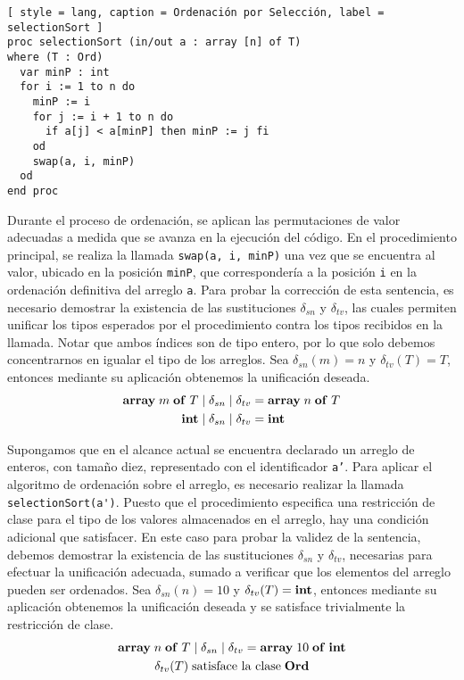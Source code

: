 \newpage

\begin{lstlisting}[ style = lang, caption = Ordenación por Selección, label = selectionSort ]
proc selectionSort (in/out a : array [n] of T)
where (T : Ord)
  var minP : int
  for i := 1 to n do
    minP := i
    for j := i + 1 to n do
      if a[j] < a[minP] then minP := j fi
    od
    swap(a, i, minP)
  od
end proc
\end{lstlisting}

Durante el proceso de ordenación, se aplican las permutaciones de valor adecuadas a medida que se avanza en la ejecución del código.
En el procedimiento principal, se realiza la llamada \lstinline[style = lang]{swap(a, i, minP)} una vez que se encuentra al valor, ubicado en la posición \texttt{minP}, que correspondería a la posición \texttt{i} en la ordenación definitiva del arreglo \texttt{a}.
Para probar la corrección de esta sentencia, es necesario demostrar la existencia de las sustituciones $\delta_{sn}$ y $\delta_{tv}$, las cuales permiten unificar los tipos esperados por el procedimiento contra los tipos recibidos en la llamada.
Notar que ambos índices son de tipo entero, por lo que solo debemos concentrarnos en igualar el tipo de los arreglos.
Sea $\delta_{sn}(m) = n$ y $\delta_{tv}(T) = T$, entonces mediante su aplicación obtenemos la unificación deseada.
\begin{align*}
\mathbf{array} \; m \; \mathbf{of} \; T \mid \delta_{sn} \mid \delta_{tv}
&=
\mathbf{array} \; n \; \mathbf{of} \; T
\\
\mathbf{int} \mid \delta_{sn} \mid \delta_{tv}
&=
\mathbf{int}
\end{align*}

Supongamos que en el alcance actual se encuentra declarado un arreglo de enteros, con tamaño diez, representado con el identificador \texttt{a'}.
Para aplicar el algoritmo de ordenación sobre el arreglo, es necesario realizar la llamada \lstinline[style = lang]{selectionSort(a')}.
Puesto que el procedimiento especifica una restricción de clase para el tipo de los valores almacenados en el arreglo, hay una condición adicional que satisfacer.
En este caso para probar la validez de la sentencia, debemos demostrar la existencia de las sustituciones $\delta_{sn}$ y $\delta_{tv}$, necesarias para efectuar la unificación adecuada, sumado a verificar que los elementos del arreglo pueden ser ordenados.
Sea $\delta_{sn}(n) = 10$ y $\delta_{tv}(T) = \mathbf{int}$, entonces mediante su aplicación obtenemos la unificación deseada y se satisface trivialmente
la restricción de clase.
\begin{gather*}
\mathbf{array} \; n \; \mathbf{of} \; T \mid \delta_{sn} \mid \delta_{tv} = \mathbf{array} \; 10 \; \mathbf{of} \; \mathbf{int}
\\
\delta_{tv}(T) \; \text{satisface la clase} \; \mathbf{Ord}
\end{gather*}

